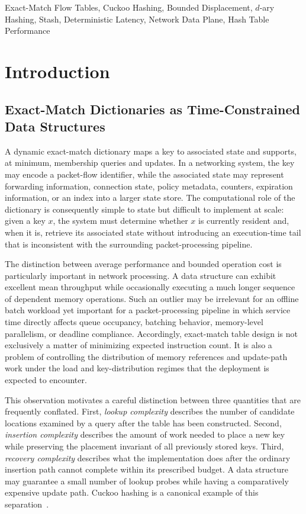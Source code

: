 \documentclass[conference]{IEEEtran}
\begin{document}
\begin{IEEEkeywords}
Exact-Match Flow Tables, Cuckoo Hashing, Bounded Displacement, $d$-ary Hashing, Stash, Deterministic Latency, Network Data Plane, Hash Table Performance
\end{IEEEkeywords}

\section{Introduction}

\subsection{Exact-Match Dictionaries as Time-Constrained Data Structures}

A dynamic exact-match dictionary maps a key to associated state and supports, at minimum, membership queries and updates. In a networking system, the key may encode a packet-flow identifier, while the associated state may represent forwarding information, connection state, policy metadata, counters, expiration information, or an index into a larger state store. The computational role of the dictionary is consequently simple to state but difficult to implement at scale: given a key $x$, the system must determine whether $x$ is currently resident and, when it is, retrieve its associated state without introducing an execution-time tail that is inconsistent with the surrounding packet-processing pipeline.

The distinction between average performance and bounded operation cost is particularly important in network processing. A data structure can exhibit excellent mean throughput while occasionally executing a much longer sequence of dependent memory operations. Such an outlier may be irrelevant for an offline batch workload yet important for a packet-processing pipeline in which service time directly affects queue occupancy, batching behavior, memory-level parallelism, or deadline compliance. Accordingly, exact-match table design is not exclusively a matter of minimizing expected instruction count. It is also a problem of controlling the distribution of memory references and update-path work under the load and key-distribution regimes that the deployment is expected to encounter.

This observation motivates a careful distinction between three quantities that are frequently conflated. First, \emph{lookup complexity} describes the number of candidate locations examined by a query after the table has been constructed. Second, \emph{insertion complexity} describes the amount of work needed to place a new key while preserving the placement invariant of all previously stored keys. Third, \emph{recovery complexity} describes what the implementation does after the ordinary insertion path cannot complete within its prescribed budget. A data structure may guarantee a small number of lookup probes while having a comparatively expensive update path. Cuckoo hashing is a canonical example of this separation~\cite{pagh2004cuckoo}.
\end{document}

